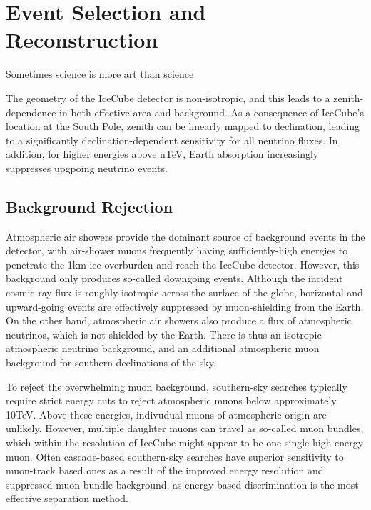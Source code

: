 \setchapterpreamble[u]{\margintoc}
\chapter{Event Selection and Reconstruction}
\begin{fquote} Sometimes science is more art than science
\end{fquote}
The geometry of the IceCube detector is non-isotropic, and this leads to a zenith-dependence in both effective area and background. As a consequence of IceCube's location at the South Pole, zenith can be linearly mapped to declination, leading to a significantly declination-dependent sensitivity for all neutrino fluxes. In addition, for higher energies above nTeV, Earth absorption increasingly suppresses upgpoing neutrino events. 

\section{Background Rejection}
Atmospheric air showers provide the dominant source of background events in the detector, with air-shower muons frequently having sufficiently-high energies to penetrate the 1km ice overburden and reach the IceCube detector. However, this background only produces so-called downgoing events. Although the incident cosmic ray flux is roughly isotropic across the surface of the globe, horizontal and upward-going events are effectively suppressed by muon-shielding from the Earth. On the other hand, atmospheric air showers also produce a flux of atmospheric neutrinos, which is not shielded by the Earth. There is thus an isotropic atmospheric neutrino background, and an additional atmospheric muon background for southern declinations of the sky. 

To reject the overwhelming muon background, southern-sky searches typically require strict energy cuts to reject atmospheric muons below approximately 10TeV. Above these energies, indivudual muons of atmospheric origin are unlikely. However, multiple daughter muons can travel as so-called muon bundles, which within the resolution of IceCube might appear to be one single high-energy muon. Often cascade-based southern-sky searches have superior sensitivity to muon-track based ones as a result of the improved energy resolution and suppressed muon-bundle background, as energy-based discrimination is the most effective separation method.

